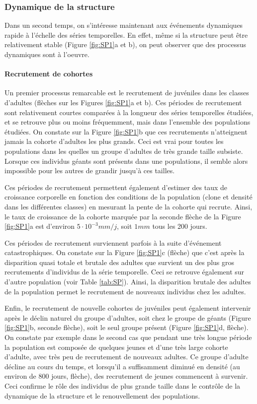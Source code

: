 \subsubsection{Dynamique de la structure}

Dans un second temps, on s'intéresse maintenant aux événements dynamiques rapide
à l'échelle des séries temporelles. En effet, même si la structure peut être
relativement stable (Figure \ref{fig:SP1}a et b), on peut observer que des
processus dynamiques sont à l'oeuvre.
 
\paragraph{Recrutement de cohortes}

Un premier processus remarcable est le recrutement de juvéniles dans les classes
d'adultes (flèches sur les Figures \ref{fig:SP1}a et b). Ces périodes de
recrutement sont relativement courtes comparées à la longueur des séries
temporelles étudiées, et se retrouve plus ou moins fréquemment, mais dans
l'ensemble des populations étudiées. On constate sur la Figure \ref{fig:SP1}b
que ces recrutements n'atteignent jamais la cohorte d'adultes les plus grands.
Ceci est vrai pour toutes les populations dans les quelles un groupe d'adultes
de très grande taille subsiste. Lorsque ces individus géants sont présents dans
une populations, il semble alors impossible pour les autres de grandir jusqu'à
ces tailles. 

Ces périodes de recrutement permettent également d'estimer des taux de
croissance corporelle en fonction des conditions de la population (clone et
densité dans les différentes classes) en mesurant la pente de la cohorte qui
recrute. Ainsi, le taux de croissance de la cohorte marquée par la seconde
flèche de la Figure \ref{fig:SP1}a est d'environ $5\cdot 10^{-3}mm/j$, soit
$1mm$ tous les 200 jours. 

Ces périodes de recrutement surviennent parfois à la suite d'événement
catastrophiques. On constate sur la Figure \ref{fig:SP1}c (flèche) que c'est
après la disparition quasi totale et brutale des adultes que survient un des
plus gros recrutements d'individus de la série temporelle. Ceci se retrouve
également sur d'autre population (voir Table \ref{tab:SP}). Ainsi, la
disparition brutale des adultes de la population permet le recrutement de
nouveaux individus chez les adultes. 

Enfin, le recrutement de nouvelle cohortes de juvéniles peut également
intervenir après le déclin naturel du groupe d'adultes, soit chez le groupe de
géants (Figure \ref{fig:SP1}b, seconde flèche), soit le seul groupe présent
(Figure \ref{fig:SP1}d, flèche). On constate par exemple dans le second cas que
pendant une très longue période la population est composée de quelques jeunes et
d'une très large cohorte d'adulte, avec très peu de recrutement de nouveaux
adultes. Ce groupe d'adulte décline au cours du temps, et lorsqu'il a
suffisamment diminué en densité (au environ de 800 jours, flèche), des
recrutement de jeunes commencent à survenir. Ceci confirme le rôle des individus
de plus grande taille dans le contrôle de la dynamique de la structure et le
renouvellement des populations. 

